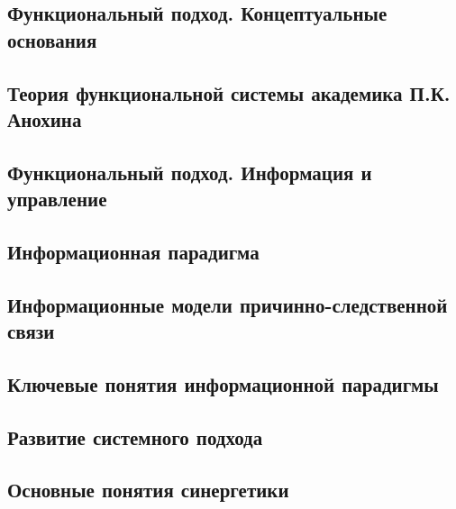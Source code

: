 \documentclass[main.tex]{subfiles}
\begin{document}

\subsection{Функциональный подход. Концептуальные основания}


\subsection{Теория функциональной системы академика П.К. Анохина}


\subsection{Функциональный подход. Информация и управление}


\subsection{Информационная парадигма}


\subsection{Информационные модели причинно-следственной связи}


\subsection{Ключевые понятия информационной парадигмы}


\subsection{Развитие системного подхода}


\subsection{Основные понятия синергетики}

\end{document}
